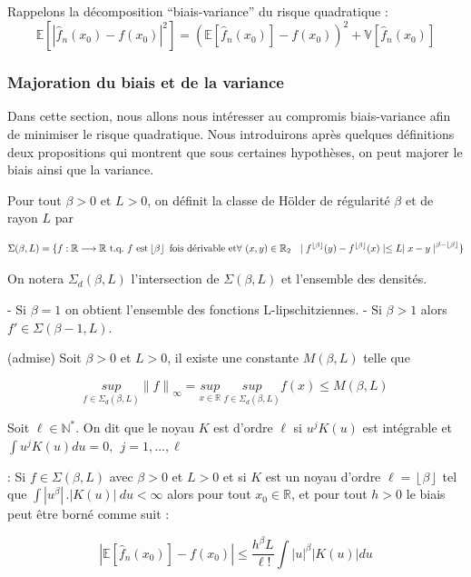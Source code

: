 \documentclass[
]{book}
\begin{document}
Rappelons la décomposition ``biais-variance'' du risque quadratique :
\[
\mathbb{E}[|\hat {f}_n(x_0) - f(x_0)|^2] = (\mathbb{E}[\hat {f}_n(x_0)] - f(x_0))^2 + \mathbb{V}[\hat {f}_n(x_0)]
\]

\hypertarget{majoration-du-biais-et-de-la-variance}{%
\subsubsection{Majoration du biais et de la variance}\label{majoration-du-biais-et-de-la-variance}}

Dans cette section, nous allons nous intéresser au compromis biais-variance afin de minimiser le risque quadratique.
Nous introduirons après quelques définitions deux propositions qui montrent que sous certaines hypothèses, on peut majorer le biais ainsi que la variance.\newline

\begin{dfn} Pour tout $\beta > 0$ et $L > 0$, on définit la classe de Hölder de régularité $\beta$ et de rayon $L$ par

$$
  \Sigma(\beta,L)={\{f:\mathbb{R} \longrightarrow \mathbb{R}\ \text{t.q.}\ f\ \text{est} \left\lfloor{\beta}\right\rfloor\ \text{fois dérivable et}   \\
  \forall\ (x,y) \in \mathbb{R}_2\ \ \mid f^{\left\lfloor{\beta}\right\rfloor}(y)-f^{\left\lfloor{\beta}\right\rfloor}(x)\mid \leq L{\mid x-y\mid}^{\beta - \left\lfloor{\beta}\right\rfloor}\}}
$$

On notera $\Sigma_d(\beta,L)$ l'intersection de $\Sigma(\beta,L)$ et l'ensemble des densités.

\end{dfn}
\begin{rem} 
- Si $\beta = 1$ on obtient l'ensemble des fonctions L-lipschitziennes.\newline
- Si $\beta > 1$ alors $f'\in \Sigma(\beta-1,L)$.
\end{rem}
\begin{prop} (admise) Soit $\beta > 0$ et $L > 0$, il existe une constante $M(\beta, L)$ telle que

$$
\underset{f \in \Sigma_d(\beta,L)}{sup}{\parallel f \parallel}_{\infty}= \underset{x \in \mathbb{R}}{sup}\ \underset{f \in \Sigma_d(\beta,L)}{sup}f(x) \leq M(\beta,L)
$$
\end{prop}

\begin{dfn} Soit $\ell \in \mathbb{N^*}$. On dit que le noyau $K$ est d'ordre $\ell$ si $u^jK(u)$ est intégrable et 
$\int u^jK(u)du =  0,\   \ j = {1,...,\ell}$

\end{dfn}
\begin{prop}: Si $f \in \Sigma(\beta,L)$ avec $\beta > 0$ et $L > 0$ et si $K$ est un noyau d'ordre $\ell = \left\lfloor{\beta}\right\rfloor$ tel que $\int |{u}^{\beta}|\,.|{K(u)}|~du < \infty$ alors pour tout $x_0 \in \mathbb{R}$, et pour tout $h>0$ le biais peut être borné comme suit :

$$
|\mathbb{E}[\hat{f}_n(x_0)] - f(x_0)|\leqslant \frac{h^{\beta}L}{\ell!}\int|u|^{\beta}|K(u)|du
$$
\end{prop}
\end{document}
